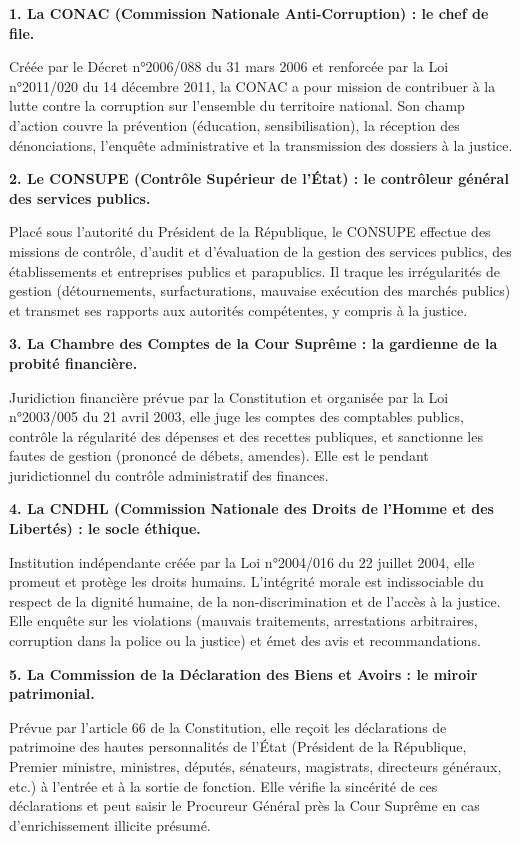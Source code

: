 \documentclass[11pt]{article}
\begin{document}
\textbf{1. La CONAC (Commission Nationale Anti-Corruption) : le chef de file.}\par
Créée par le Décret n°2006/088 du 31 mars 2006 et renforcée par la Loi n°2011/020 du 14 décembre 2011, la CONAC a pour mission de contribuer à la lutte contre la corruption sur l'ensemble du territoire national. Son champ d'action couvre la prévention (éducation, sensibilisation), la réception des dénonciations, l'enquête administrative et la transmission des dossiers à la justice.

\textbf{2. Le CONSUPE (Contrôle Supérieur de l'État) : le contrôleur général des services publics.}\par
Placé sous l'autorité du Président de la République, le CONSUPE effectue des missions de contrôle, d'audit et d'évaluation de la gestion des services publics, des établissements et entreprises publics et parapublics. Il traque les irrégularités de gestion (détournements, surfacturations, mauvaise exécution des marchés publics) et transmet ses rapports aux autorités compétentes, y compris à la justice.

\textbf{3. La Chambre des Comptes de la Cour Suprême : la gardienne de la probité financière.}\par
Juridiction financière prévue par la Constitution et organisée par la Loi n°2003/005 du 21 avril 2003, elle juge les comptes des comptables publics, contrôle la régularité des dépenses et des recettes publiques, et sanctionne les fautes de gestion (prononcé de débets, amendes). Elle est le pendant juridictionnel du contrôle administratif des finances.

\textbf{4. La CNDHL (Commission Nationale des Droits de l'Homme et des Libertés) : le socle éthique.}\par
Institution indépendante créée par la Loi n°2004/016 du 22 juillet 2004, elle promeut et protège les droits humains. L'intégrité morale est indissociable du respect de la dignité humaine, de la non-discrimination et de l'accès à la justice. Elle enquête sur les violations (mauvais traitements, arrestations arbitraires, corruption dans la police ou la justice) et émet des avis et recommandations.

\textbf{5. La Commission de la Déclaration des Biens et Avoirs : le miroir patrimonial.}\par
Prévue par l'article 66 de la Constitution, elle reçoit les déclarations de patrimoine des hautes personnalités de l'État (Président de la République, Premier ministre, ministres, députés, sénateurs, magistrats, directeurs généraux, etc.) à l'entrée et à la sortie de fonction. Elle vérifie la sincérité de ces déclarations et peut saisir le Procureur Général près la Cour Suprême en cas d'enrichissement illicite présumé.
\end{document}
